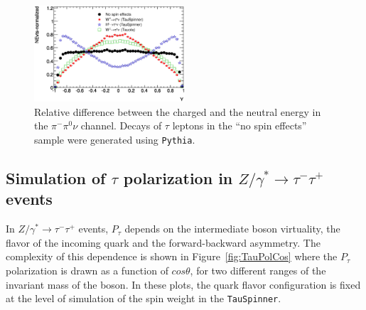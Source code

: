 \documentclass[12pt]{article}
\def\Ztautau{\ensuremath{Z/\gamma^{*}\to\tau^{-}\tau^{+}}\xspace}
\def\Tau{\ensuremath{\tau}\xspace}
\def\RHO{\ensuremath{\pi^{-}\pi^{0}\nu}\xspace}
\def\PTAU{\ensuremath{P_{\tau}}\xspace}
\begin{document}
\begin{figure}
 \centering
  \includegraphics[width=0.5\textwidth]{figures-Tau_Y_RHO_Dziubek}
  \caption{Relative difference between the
  charged and the neutral energy in the \RHO channel. Decays of \Tau leptons in the ``no spin effects'' sample were generated using {\tt Pythia}.  
\label{fig:TauPolarPythia}}
\end{figure}



\subsection{Simulation of \Tau polarization in \Ztautau events}


In \Ztautau events, \PTAU depends on the intermediate boson virtuality,
the flavor of the incoming quark and the forward-backward asymmetry.
The complexity of this dependence is shown in
Figure~\ref{fig:TauPolCos} where the \PTAU polarization is drawn as a function 
of $cos\theta$, for two different ranges of the invariant mass of the boson.
In these plots, the quark flavor configuration is fixed at the level of simulation of the spin weight in the {\tt TauSpinner}.
\end{document}

